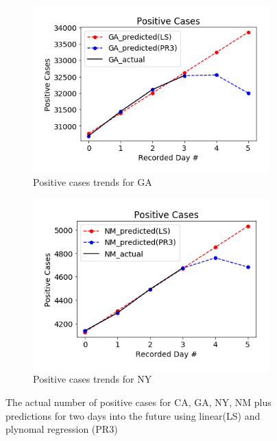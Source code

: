 \documentclass[11pt]{article}
\begin{document}
\begin{figure}[h]
\begin{subfigure}[b]{0.49\textwidth}
         \includegraphics[width=\textwidth]{diagrams/analysis/positive_trend_GA.png}
         \caption{Positive cases trends for GA}
     \end{subfigure}
     \begin{subfigure}[b]{0.49\textwidth}
         \centering
         \includegraphics[width=\textwidth]{diagrams/analysis/positive_trend_NM.png}
         \caption{Positive cases trends for NY}
         \label{fig:three sin x}
     \end{subfigure}
        \caption{The actual number of positive cases for CA, GA, NY, NM plus predictions for two days into the future using linear(LS) and plynomal regression (PR3)}
        \label{fig:pos_trends}

\end{figure}
\pagebreak
\end{document}
